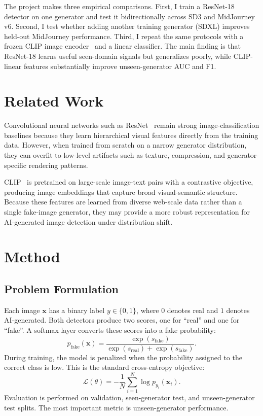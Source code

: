 \documentclass[conference]{IEEEtran}
\begin{document}
The project makes three empirical comparisons. First, I train a ResNet-18
detector on one generator and test it bidirectionally across SD3 and
MidJourney v6. Second, I test whether adding another training generator
(SDXL) improves held-out MidJourney performance. Third, I repeat the same
protocols with a frozen CLIP image encoder~\cite{radford2021clip} and a
linear classifier. The main finding is that ResNet-18 learns useful seen-domain
signals but generalizes poorly, while CLIP-linear features substantially
improve unseen-generator AUC and F1.

\section{Related Work}

Convolutional neural networks such as ResNet~\cite{he2016resnet} remain strong
image-classification baselines because they learn hierarchical visual features
directly from the training data. However, when trained from scratch on a narrow
generator distribution, they can overfit to low-level artifacts such as
texture, compression, and generator-specific rendering patterns.

CLIP~\cite{radford2021clip} is pretrained on large-scale image-text pairs with
a contrastive objective, producing image embeddings that capture broad
visual-semantic structure. Because these features are learned from diverse
web-scale data rather than a single fake-image generator, they may provide a
more robust representation for AI-generated image detection under distribution
shift.

\section{Method}

\subsection{Problem Formulation}

Each image $\mathbf{x}$ has a binary label $y \in \{0,1\}$, where $0$ denotes
real and $1$ denotes AI-generated. Both detectors produce two scores, one for
``real'' and one for ``fake''. A softmax layer converts these scores into a
fake probability:
\begin{equation}
p_{\mathrm{fake}}(\mathbf{x})=
\frac{\exp(s_{\mathrm{fake}})}
{\exp(s_{\mathrm{real}})+\exp(s_{\mathrm{fake}})}.
\end{equation}
During training, the model is penalized when the probability assigned to the
correct class is low. This is the standard cross-entropy objective:
\begin{equation}
\mathcal{L}(\theta)=
-\frac{1}{N}\sum_{i=1}^{N}\log p_{y_i}(\mathbf{x}_i).
\end{equation}
Evaluation is performed on validation, seen-generator test, and
unseen-generator test splits. The most important metric is unseen-generator
performance.
\end{document}
